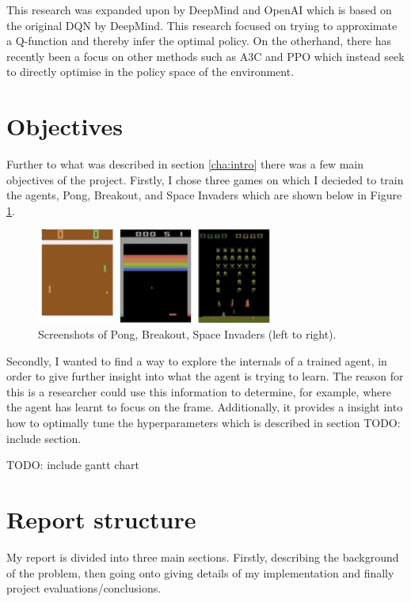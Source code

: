 This research was expanded upon by DeepMind and OpenAI which is based on the original DQN by DeepMind. This research focused on trying to approximate a Q-function and thereby infer the optimal policy. On the otherhand, there has recently been a focus on other methods such as A3C and PPO which instead seek to directly optimise in the policy space of the environment.

\section{Objectives}
\label{intro:sec:obj}
Further to what was described in section \ref{cha:intro} there was a few main objectives of the project. Firstly, I chose three games on which I decieded to train the agents, Pong, Breakout, and Space Invaders which are shown below in Figure \ref{fig:atari-screenshot}.

\begin{figure}[htbp]
	\centering
	\includegraphics[width=0.7\textwidth]{chapters/chapter1/images/atari-combined.jpg}
	\caption{Screenshots of Pong, Breakout, Space Invaders (left to right).
		\label{fig:atari-screenshot}
	}
\end{figure}


Secondly, I wanted to find a way to explore the internals of a trained agent, in order to give further insight into what the agent is trying to learn. The reason for this is a researcher could use this information to determine, for example, where the agent has learnt to focus on the frame. Additionally, it provides a insight into how to optimally tune the hyperparameters which is described in section TODO: include section.

TODO: include gantt chart

\section{Report structure}
\label{intro:sec:report_struc}

My report is divided into three main sections. Firstly, describing the background of the problem, then going onto giving details of my implementation and finally project evaluations/conclusions.